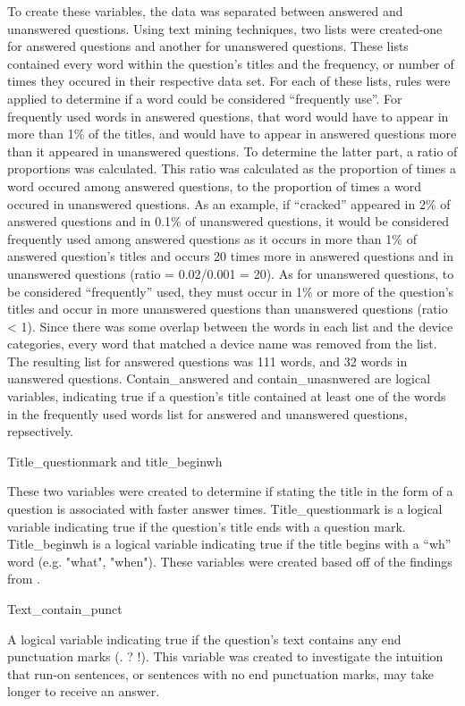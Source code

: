 \documentclass[12pt]{article}
\begin{document}
  To create these variables, the data was separated between answered and unanswered questions. Using text mining techniques, two lists were created-one for answered questions and another for unanswered questions. These lists contained every word within the question's titles and the frequency, or number of times they occured in their respective data set. For each of these lists, rules were applied to determine if a word could be considered ``frequently use''. For frequently used words in answered questions, that word would have to appear in more than 1\% of the titles, and would have to appear in answered questions more than it appeared in unanswered questions. To determine the latter part, a ratio of proportions was calculated. This ratio was calculated as the proportion of times a word occured among answered questions, to the proportion of times a word occured in unanswered questions. As an example, if ``cracked'' appeared in 2\% of answered questions and in 0.1\% of unanswered questions, it would be considered frequently used among answered questions as it occurs in more than 1\% of answered question's titles and occurs 20 times more in answered questions and in unanswered questions (ratio = 0.02/0.001 = 20). As for unanswered questions, to be considered ``frequently'' used, they must occur in 1\% or more of the question's titles and occur in more unanswered questions than unanswered questions (ratio < 1). Since there was some overlap between the words in each list and the device categories, every word that matched a device name was removed from the list. The resulting list for answered questions was 111 words, and 32 words in uanswered questions. Contain_answered and contain_unasnwered are logical variables, indicating true if a question's title contained at least one of the words in the frequently used words list for answered and unanswered questions, repsectively.
  
  Title\_questionmark and title\_beginwh 

These two variables were created to determine if stating the title in the form of a question is associated with faster answer times. Title_questionmark is a logical variable indicating true if the question's title ends with a question mark. Title_beginwh is a logical variable indicating true if the title begins with a “wh” word (e.g. "what", "when"). These variables were created based off of the findings from \citep{Bhat2014}. 
  
  
  Text\_contain\_punct

A logical variable indicating true if the question’s text contains any end punctuation marks (. ? !). This variable was created to investigate the intuition that run-on sentences, or sentences with no end punctuation marks, may take longer to receive an answer. 
\end{document}
